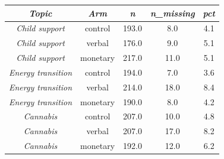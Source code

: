 \begin{tabular}{c c c c c}
      \hline
      \textit{Topic} & \textit{Arm} & \textit{n} & \textit{n\_missing} & \textit{pct} \\
      \hline
      \textit{Child support} & control & 193.0 & 8.0 & 4.1 \\
      \textit{Child support} & verbal & 176.0 & 9.0 & 5.1 \\
      \textit{Child support} & monetary & 217.0 & 11.0 & 5.1 \\
      \textit{Energy transition} & control & 194.0 & 7.0 & 3.6 \\
      \textit{Energy transition} & verbal & 214.0 & 18.0 & 8.4 \\
      \textit{Energy transition} & monetary & 190.0 & 8.0 & 4.2 \\
      \textit{Cannabis} & control & 207.0 & 10.0 & 4.8 \\
      \textit{Cannabis} & verbal & 207.0 & 17.0 & 8.2 \\
      \textit{Cannabis} & monetary & 192.0 & 12.0 & 6.2 \\
      \hline
    \end{tabular}
